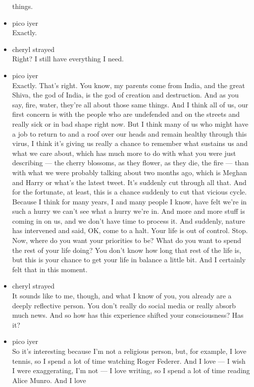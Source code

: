 \begin{itemize}
  things.
\item
  pico iyer\\
  Exactly.
\item
  cheryl strayed\\
  Right? I still have everything I need.
\item
  pico iyer\\
  Exactly. That's right. You know, my parents come from India, and the
  great Shiva, the god of India, is the god of creation and destruction.
  And as you say, fire, water, they're all about those same things. And
  I think all of us, our first concern is with the people who are
  undefended and on the streets and really sick or in bad shape right
  now. But I think many of us who might have a job to return to and a
  roof over our heads and remain healthy through this virus, I think
  it's giving us really a chance to remember what sustains us and what
  we care about, which has much more to do with what you were just
  describing --- the cherry blossoms, as they flower, as they die, the
  fire --- than with what we were probably talking about two months ago,
  which is Meghan and Harry or what's the latest tweet. It's suddenly
  cut through all that. And for the fortunate, at least, this is a
  chance suddenly to cut that vicious cycle. Because I think for many
  years, I and many people I know, have felt we're in such a hurry we
  can't see what a hurry we're in. And more and more stuff is coming in
  on us, and we don't have time to process it. And suddenly, nature has
  intervened and said, OK, come to a halt. Your life is out of control.
  Stop. Now, where do you want your priorities to be? What do you want
  to spend the rest of your life doing? You don't know how long that
  rest of the life is, but this is your chance to get your life in
  balance a little bit. And I certainly felt that in this moment.
\item
  cheryl strayed\\
  It sounds like to me, though, and what I know of you, you already are
  a deeply reflective person. You don't really do social media or really
  absorb much news. And so how has this experience shifted your
  consciousness? Has it?
\item
  pico iyer\\
  So it's interesting because I'm not a religious person, but, for
  example, I love tennis, so I spend a lot of time watching Roger
  Federer. And I love --- I wish I were exaggerating, I'm not --- I love
  writing, so I spend a lot of time reading Alice Munro. And I love

\end{itemize}
